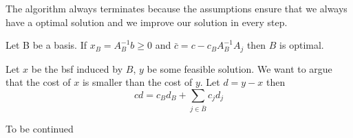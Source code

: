 The algorithm always terminates because the assumptions ensure that we always have a optimal solution and we improve our solution in every step.

\begin{thm}\label{Pr:simplexIIIopt} Let B be a basis. If $x_B=A^{-1}_Bb\geq 0$ and $\bar c=c- c_B A_B^{-1}A_j$ then $B$ is optimal.\end{thm}

\begin{pr} Let $x$ be the bsf induced by $B$, $y$ be some feasible solution. We want to argue that the cost of $x$ is smaller than the cost of $y$. Let $d=y-x$ then 
\[cd = c_Bd_B + \sum_{j\in \bar B} c_jd_j \] 

To be continued
\end{pr}